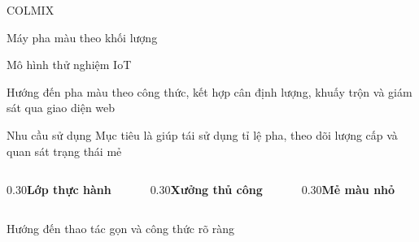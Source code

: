 \documentclass[aspectratio=169,11pt]{beamer}
\begin{document}
\begin{frame}{COLMIX}
\vspace{0.12cm}
{\LARGE Máy pha màu theo khối lượng\par}
{\large Mô hình thử nghiệm IoT\par}
\vspace{0.45cm}
Hướng đến pha màu theo công thức, kết hợp cân định lượng, khuấy trộn và giám sát qua giao diện web
\vspace{0.55cm}
\begin{center}
\end{center}
\end{frame}

\begin{frame}{Nhu cầu sử dụng}
\vspace{0.3cm}
Mục tiêu là giúp tái sử dụng tỉ lệ pha, theo dõi lượng cấp và quan sát trạng thái mẻ
\vspace{0.8cm}
\begin{columns}[T,onlytextwidth]
\begin{column}{0.30\textwidth}\textbf{Lớp thực hành}\end{column}
\begin{column}{0.30\textwidth}\textbf{Xưởng thủ công}\end{column}
\begin{column}{0.30\textwidth}\textbf{Mẻ màu nhỏ}\end{column}
\end{columns}
\vspace{0.5cm}
Hướng đến thao tác gọn và công thức rõ ràng
\end{frame}
\end{document}
